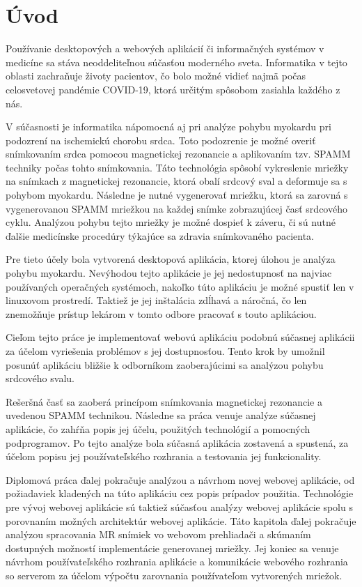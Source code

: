 \chapter {Úvod}
Používanie desktopových a webových aplikácií či informačných systémov v medicíne sa stáva neoddeliteľnou súčasťou moderného sveta. Informatika v tejto oblasti zachraňuje životy pacientov, čo bolo možné vidieť najmä počas celosvetovej pandémie COVID-19, ktorá určitým spôsobom zasiahla každého z nás.

V súčasnosti je informatika nápomocná aj pri analýze pohybu myokardu pri podozrení na ischemickú chorobu srdca. Toto podozrenie je možné overiť snímkovaním srdca pomocou magnetickej rezonancie a aplikovaním tzv. SPAMM techniky počas tohto snímkovania. Táto technológia spôsobí vykreslenie mriežky na snímkach z magnetickej rezonancie, ktorá obalí srdcový sval a deformuje sa s pohybom myokardu. Následne je nutné vygenerovať mriežku, ktorá sa zarovná s vygenerovanou SPAMM mriežkou na každej snímke zobrazujúcej časť srdcového cyklu. Analýzou pohybu tejto mriežky je možné dospieť k záveru, či sú nutné ďalšie medicínske procedúry týkajúce sa zdravia snímkovaného pacienta.

Pre tieto účely bola vytvorená desktopová aplikácia, ktorej úlohou je analýza pohybu myokardu. Nevýhodou tejto aplikácie je jej nedostupnosť na najviac používaných operačných systémoch, nakoľko túto aplikáciu je možné spustiť len v linuxovom prostredí. Taktiež je jej inštalácia zdĺhavá a náročná, čo len znemožňuje prístup lekárom v tomto odbore pracovať s touto aplikáciou.

\clearpage

Cieľom tejto práce je implementovať webovú aplikáciu podobnú súčasnej aplikácii za účelom vyriešenia problémov s jej dostupnosťou. Tento krok by umožnil posunúť aplikáciu bližšie k odborníkom zaoberajúcimi sa analýzou pohybu srdcového svalu.

Rešeršná časť sa zaoberá princípom snímkovania magnetickej rezonancie a uvedenou SPAMM technikou. Následne sa práca venuje analýze súčasnej aplikácie, čo zahŕňa popis jej účelu, použitých technológií a pomocných podprogramov. Po tejto analýze bola súčasná aplikácia zostavená a spustená, za účelom popisu jej používateľského rozhrania a testovania jej funkcionality.

Diplomová práca ďalej pokračuje analýzou a návrhom novej webovej aplikácie, od požiadaviek kladených na túto aplikáciu cez popis prípadov použitia. Technológie pre vývoj webovej aplikácie sú taktiež súčasťou analýzy webovej aplikácie spolu s porovnaním možných architektúr webovej aplikácie.  Táto kapitola ďalej pokračuje analýzou spracovania MR snímiek vo webovom prehliadači a skúmaním dostupných možností implementácie generovanej mriežky. Jej koniec sa venuje návrhom používateľského rozhrania aplikácie a komunikácie webového rozhrania so serverom za účelom výpočtu zarovnania používateľom vytvorených mriežok.

